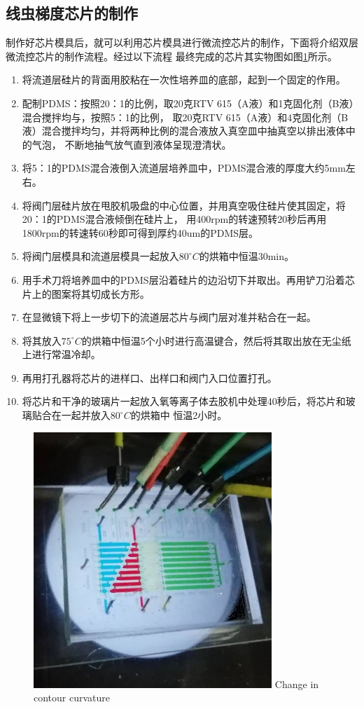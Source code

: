 \subsection{线虫梯度芯片的制作}
	制作好芯片模具后，就可以利用芯片模具进行微流控芯片的制作，下面将介绍双层微流控芯片的制作流程。经过以下流程
	最终完成的芯片其实物图如图\ref{fig:chap2:chip-fabric}所示。
	\begin{enumerate}[label={\alph*)},font={\color{black!50!black}\bfseries}]
	\item 将流道层硅片的背面用胶粘在一次性培养皿的底部，起到一个固定的作用。
	\item 配制PDMS：按照20：1的比例，取20克RTV 615（A液）和1克固化剂（B液）混合搅拌均与，按照5：1的比例，
	取20克RTV 615（A液）和4克固化剂（B液）混合搅拌均匀，并将两种比例的混合液放入真空皿中抽真空以排出液体中的气泡，
	不断地抽气放气直到液体呈现澄清状。
	\item 将5：1的PDMS混合液倒入流道层培养皿中，PDMS混合液的厚度大约5mm左右。
	\item 将阀门层硅片放在甩胶机吸盘的中心位置，并用真空吸住硅片使其固定，将20：1的PDMS混合液倾倒在硅片上，
	用400rpm的转速预转20秒后再用1800rpm的转速转60秒即可得到厚约40um的PDMS层。
	\item 将阀门层模具和流道层模具一起放入$80^\circ C$的烘箱中恒温30min。
	\item 用手术刀将培养皿中的PDMS层沿着硅片的边沿切下并取出。再用铲刀沿着芯片上的图案将其切成长方形。
	\item 在显微镜下将上一步切下的流道层芯片与阀门层对准并粘合在一起。
	\item 将其放入$75^\circ C$的烘箱中恒温5个小时进行高温键合，然后将其取出放在无尘纸上进行常温冷却。
	\item 再用打孔器将芯片的进样口、出样口和阀门入口位置打孔。
	\item 将芯片和干净的玻璃片一起放入氧等离子体去胶机中处理40秒后，将芯片和玻璃贴合在一起并放入$80^\circ C$的烘箱中
	恒温2小时。
	\end{enumerate}
	\begin{figure}[htbp]
	  \centering
	  \includegraphics[width=9cm]{figure/chap2/fabric-chip.jpg}
		{Change in contour curvature}
	  \label{fig:chap2:chip-fabric}
	\end{figure}
